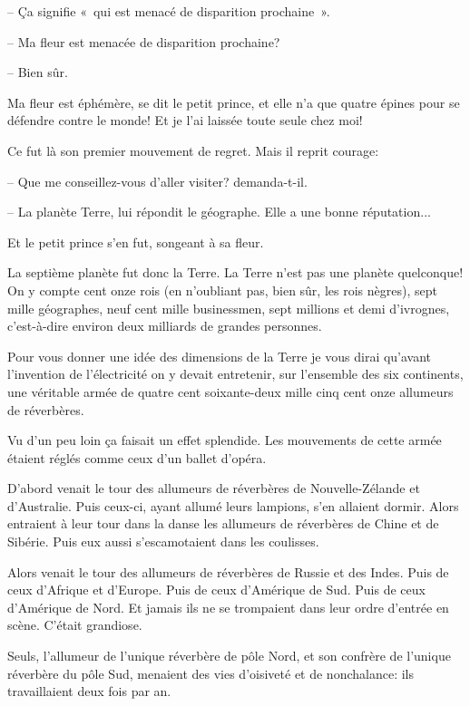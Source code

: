 \documentclass[a4paper]{report}
\begin{document}
-- Ça signifie «~qui est menacé de disparition prochaine~».

-- Ma fleur est menacée de disparition prochaine?

-- Bien sûr.

Ma fleur est éphémère, se dit le petit prince, et elle n'a que quatre épines pour se défendre contre le monde! Et je l'ai laissée toute seule chez moi!

Ce fut là son premier mouvement de regret. Mais il reprit courage:

-- Que me conseillez-vous d'aller visiter? demanda-t-il.

-- La planète Terre, lui répondit le géographe. Elle a une bonne réputation...

Et le petit prince s'en fut, songeant à sa fleur.

\parachapter[XVI]{} %
La septième planète fut donc la Terre.
La Terre n'est pas une planète quelconque! On y compte cent onze rois (en n'oubliant pas, bien sûr, les rois nègres), sept mille géographes, neuf cent mille businessmen, sept millions et demi d'ivrognes, c'est-à-dire environ deux milliards de grandes personnes.

Pour vous donner une idée des dimensions de la Terre je vous dirai qu'avant l'invention de l'électricité on y devait entretenir, sur l'ensemble des six continents, une véritable armée de quatre cent soixante-deux mille cinq cent onze allumeurs de réverbères.

Vu d'un peu loin ça faisait un effet splendide. Les mouvements de cette armée étaient réglés comme ceux d'un ballet d'opéra.

D'abord venait le tour des allumeurs de réverbères de Nouvelle-Zélande et d'Australie. Puis ceux-ci, ayant allumé leurs lampions, s'en allaient dormir. Alors entraient à leur tour dans la danse les allumeurs de réverbères de Chine et de Sibérie. Puis eux aussi s'escamotaient dans les coulisses.

Alors venait le tour des allumeurs de réverbères de Russie et des Indes. Puis de ceux d'Afrique et d'Europe. Puis de ceux d'Amérique de Sud. Puis de ceux d'Amérique de Nord. Et jamais ils ne se trompaient dans leur ordre d'entrée en scène. C'était grandiose.

Seuls, l'allumeur de l'unique réverbère de pôle Nord, et son confrère de l'unique réverbère du pôle Sud, menaient des vies d'oisiveté et de nonchalance: ils travaillaient deux fois par an.
\end{document}
